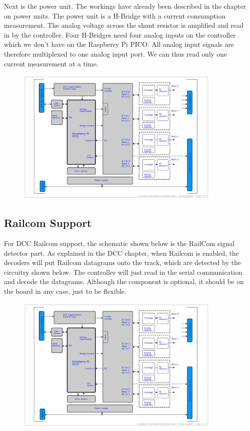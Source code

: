 Next is the power unit. The workings have already been described in the chapter on power units. The power unit is a H-Bridge with a current consumption measurement. The analog voltage across the shunt resistor is amplified and read in by the controller. Four H-Bridges need four analog inputs on the controller which we don't have on the Raspberry Pi PICO. All analog input signals are therefore multiplexed to one analog input port. We can thus read only one current measurement at a time.

\begin{figure}[htbp]
    \centering
    \includegraphics[page=4, width=0.9\textwidth]{./Schematics/Schematic_LcsNodes-Quad-Block-Controller.pdf}
\end{figure}
\FloatBarrier

\subsection{Railcom Support}

For DCC Railcom support, the schematic shown below is the RailCom signal detector part. As explained in the DCC chapter, when Railcom is enabled, the decoders will put Railcom datagrams onto the track, which are detected by the circuitry shown below. The controller will just read in the serial communication and decode the datagrams. Although the component is optional, it should be on the board in any case, just to be flexible.

\begin{figure}[htbp]
    \centering
    \includegraphics[page=5, width=0.9\textwidth]{./Schematics/Schematic_LcsNodes-Quad-Block-Controller.pdf}
\end{figure}
\FloatBarrier

